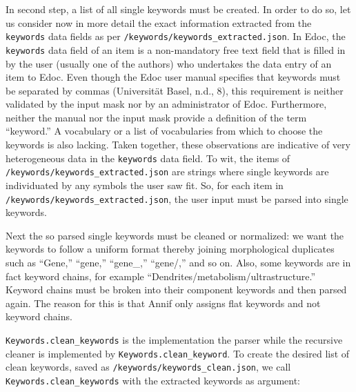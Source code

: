 In second step, a list of all single keywords must be created. In order
to do so, let us consider now in more detail the exact information
extracted from the \texttt{keywords} data fields as per
\texttt{/keywords/keywords\_extracted.json}. In Edoc, the
\texttt{keywords} data field of an item is a non-mandatory free text
field that is filled in by the user (usually one of the authors) who
undertakes the data entry of an item to Edoc. Even though the Edoc user
manual specifies that keywords must be separated by commas (Universität
Basel, n.d., 8), this requirement is neither validated by the input mask
nor by an administrator of Edoc. Furthermore, neither the manual nor the
input mask provide a definition of the term ``keyword.'' A vocabulary or
a list of vocabularies from which to choose the keywords is also
lacking. Taken together, these observations are indicative of very
heterogeneous data in the \texttt{keywords} data field. To wit, the
items of \texttt{/keywords/keywords\_extracted.json} are strings where
single keywords are individuated by any symbols the user saw fit. So,
for each item in \texttt{/keywords/keywords\_extracted.json}, the user
input must be parsed into single keywords.

Next the so parsed single keywords must be cleaned or normalized: we
want the keywords to follow a uniform format thereby joining
morphological duplicates such as ``Gene,'' ``gene,'' ``gene\_,''
``gene/,'' and so on. Also, some keywords are in fact keyword chains,
for example ``Dendrites/metabolism/ultrastructure.'' Keyword chains must
be broken into their component keywords and then parsed again. The
reason for this is that Annif only assigns flat keywords and not keyword
chains.

\texttt{Keywords.clean\_keywords} is the implementation the parser while
the recursive cleaner is implemented by
\texttt{Keywords.clean\_keyword}. To create the desired list of clean
keywords, saved as \texttt{/keywords/keywords\_clean.json}, we call
\texttt{Keywords.clean\_keywords} with the extracted keywords as
argument:

\begin{Shaded}
\begin{Highlighting}[]
\OperatorTok{=}\OperatorTok{+} \NormalTok{)}
\OperatorTok{=}
\OperatorTok{+} \NormalTok{)}
\end{Highlighting}
\end{Shaded}

